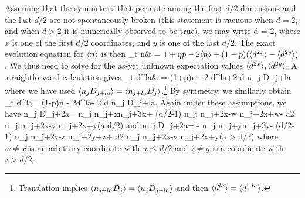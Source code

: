 \documentclass[pra,aps,twocolumn,groupedaddress,superscriptaddress,nofootinbib,preprintnumbers]{revtex4-2}
\begin{document}
\begin{widetext}
		Assuming that the symmetries that permute among the first $d/2$ dimensions and the last $d/2$ are not spontaneously broken (this statement is vacuous when $d=2$, and when $d>2$ it is numerically observed to be true), we may write 
		\be {}d = 2,\ee 
		where $x$ is one of the first $d/2$ coordinates, and $y$ is one of the last $d/2$. The exact evolution equation for $\langle n \rangle$ is then 
		\bea \p_t \lan n\ran & = \( 1+\eta p - 2\lan n\ran + (1-p)(\lan d^{2x}\ran - \lan \ob d^{2y} \ran) \).
		\eea 
		We thus need to solve for the as-yet unknown expectation values $\lan d^{2x}\ran,\lan \ob d^{2y}\ran$. A straightforward calculation gives 
		\bea \p_t \lan d^{la}\ran & = (1+\eta p)\lan n \ran - 2 \lan d^{la}\ran +2 d \lan n_j D_{j+la}\ran\eea 
		where we have used $\langle n_j D_{j+la}\rangle = \langle n_{j+la} D_j\rangle$.\footnote{Translation implies $\langle n_{j+la}D_j\rangle = \langle n_j D_{j-la}\rangle$ and then $\langle d^{la}\rangle =\langle d^{-la} \rangle$.} By symmetry, we similarly obtain
		\be \p_t \lan \ob d^{la}\ran = (1-\eta p)\lan \ob n \ran - 2\lan \ob d^{la}\ran - 2 d \lan \ob n_j D_{j+la}\ran.\ee 
		Again under these assumptions, we have 
		\be \lan n_j D_{j+2a}\ran=  \lan n_j n_{j+x}n_{j+3x}\ran  + (d/2-1) \lan n_j n_{j+2x-w} n_{j+2x+w}\ran - \frac d2 \lan n_j \ob n_{j+2x-y} \ob n_{j+2x+y}\ran \qq (a \leq  d/2) \ee 
		and 
		\be \lan \ob n_j D_{j+2a}\ran= - \lan \ob n_j \ob n_{j+y}\ob n_{j+3y}\ran  - (d/2-1) \lan \ob n_j \ob n_{j+2y-z} \ob n_{j+2y+z}\ran + \frac d2 \lan \ob n_j n_{j+2x-y} n_{j+2x+y}\ran \qq (a > d/2) \ee
		where $w\neq x$ is an arbitrary coordinate with $w \leq d/2$ and $z\neq y$ is a coordinate with $z>d/2$. 
		

\end{widetext}
\end{document}
